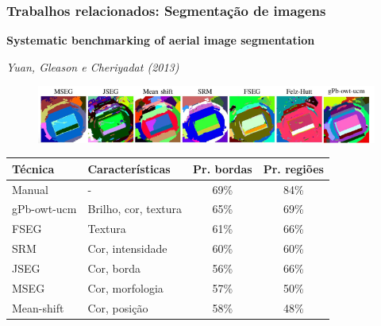 \documentclass[t]{beamer}
\begin{document}
\begin{frame}[c]
	\frametitle{Trabalhos relacionados: Segmentação de imagens}

	\textbf{Systematic benchmarking of aerial image segmentation}

	\textit{Yuan, Gleason e Cheriyadat (2013)}

	\begin{figure}[h]
		\includegraphics[width=\textwidth]{imgs/yuan_2013}
	\end{figure}

	\small{
	\begin{table}[h]
	\centering
	\begin{tabulary}{\linewidth}{|L|L|C|C|}
	\hline
	\textbf{Técnica} & \textbf{Características} & \textbf{Pr. bordas} & \textbf{Pr. regiões } \\ \hline
	Manual      & \hspace{1cm} -       & 69\% & 84\% \\ \hline
	 gPb-owt-ucm &  Brilho, cor, textura &  65\% &  69\% \\ \hline
	FSEG        & Textura              & 61\% & 66\% \\ \hline
	SRM         & Cor, intensidade     & 60\% & 60\% \\ \hline
	JSEG        & Cor, borda           & 56\% & 66\% \\ \hline
	MSEG        & Cor, morfologia      & 57\% & 50\% \\ \hline
	Mean-shift  & Cor, posição         & 58\% & 48\% \\ \hline
	\end{tabulary}
	\end{table}
	}
\end{frame}

%
%
%
%	
%
%
%
\end{document}
